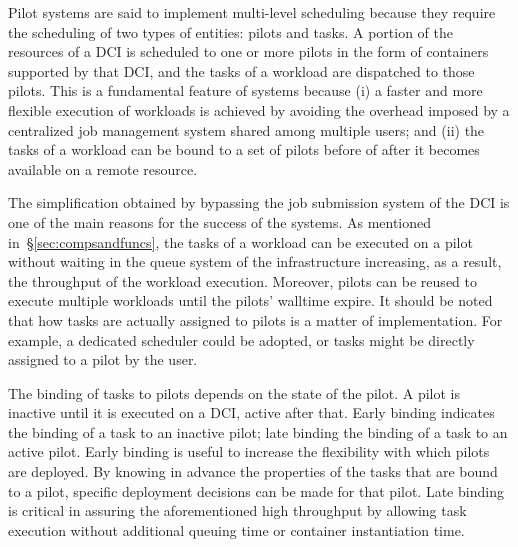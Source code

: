 \documentclass{sig-alternate}
\begin{document}
Pilot systems are said to implement multi-level scheduling because they require
the scheduling of two types of entities: pilots and tasks. A portion of the
resources of a DCI is scheduled to one or more pilots in the form of containers
supported by that DCI, and the tasks of a workload are dispatched to those
pilots. This is a fundamental feature of \pilot systems because (i) a faster
and more flexible execution of workloads is achieved by avoiding the overhead
imposed by a centralized job management system shared among multiple users; and
(ii) the tasks of a workload can be bound to a set of pilots before of after it
becomes available on a remote resource. 

The simplification obtained by bypassing the job submission system of
the DCI is one of the main reasons for the success of the \pilot
systems. As mentioned in~\S\ref{sec:compsandfuncs}, the tasks of a workload can
be executed on a pilot without waiting in the queue system of the
infrastructure increasing, as a result, the throughput of the workload
execution. Moreover, pilots can be reused to execute multiple workloads
until the pilots' walltime expire. It should be noted that how tasks are
actually assigned to pilots is a matter of implementation. For example,
a dedicated scheduler could be adopted, or tasks might be directly
assigned to a pilot by the user.

The binding of tasks to pilots depends on the state of the pilot. A
pilot is inactive until it is executed on a DCI, active after that.
Early binding indicates the binding of a task to an inactive pilot; late
binding the binding of a task to an active pilot. Early binding is
useful to increase the flexibility with which pilots are deployed. By
knowing in advance the properties of the tasks that are bound to a
pilot, specific deployment decisions can be made for that pilot.
 Late binding is critical in
assuring the aforementioned high throughput by allowing task execution without
additional queuing time or container instantiation time.
\end{document}
